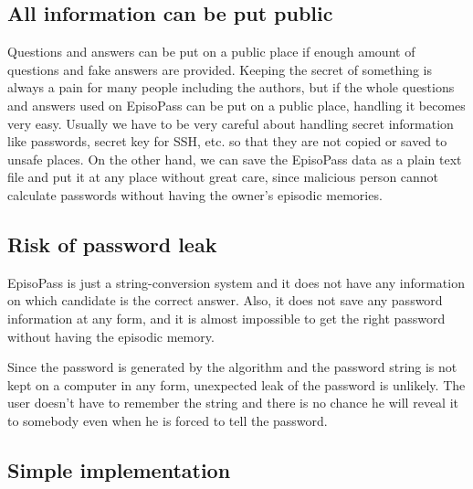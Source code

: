 \documentclass{article}
\begin{document}
\subsection{All information can be put public}

Questions and answers can be put on a public place
if enough amount of questions and fake answers are provided.
%
Keeping the secret of something is always a pain for many people including
the authors, but if the whole questions and answers used on EpisoPass
can be put on a public place,
handling it becomes very easy.
Usually we have to be very careful about handling
secret information like passwords, secret key for SSH, etc.
so that they are not copied or saved to unsafe places.
On the other hand,
we can save the EpisoPass data as a plain text file and put it at
any place without great care, since malicious person cannot calculate
passwords without having the owner's episodic memories.


\subsection{Risk of password leak}

EpisoPass is just a string-conversion system and it does not
have any information on which candidate is the correct answer.
Also, it does not save any password information at any form, and
it is almost impossible to get the right password 
without having the episodic memory.


Since the password is generated by the algorithm and the password
string is not kept on a computer in any form,
unexpected leak of the password is unlikely.
The user doesn't have to remember the string and
there is no chance he will reveal it to somebody
even when he is forced to tell the password.


\subsection{Simple implementation}
\end{document}
